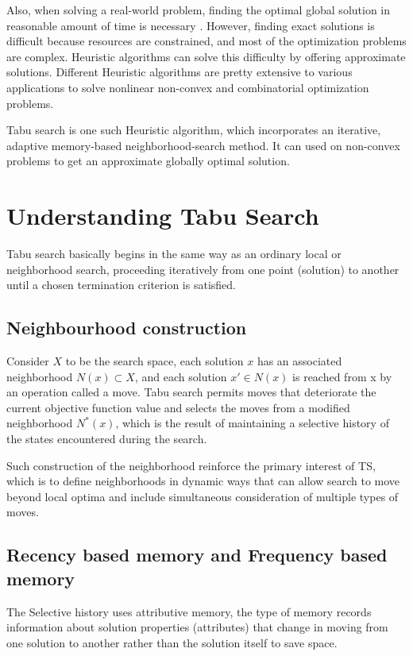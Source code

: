 \documentclass[conference]{IEEEtran}
\begin{document}
Also, when solving a real-world problem, finding the optimal global solution in
reasonable amount of time is necessary . However, finding exact solutions is difficult
because resources are constrained, and most of the optimization problems are
complex. Heuristic algorithms can solve this difficulty by offering approximate solutions.
Different Heuristic algorithms are pretty extensive to various applications to solve nonlinear non-convex and combinatorial optimization problems.

Tabu search is one such Heuristic algorithm, which incorporates an iterative, adaptive
memory-based neighborhood-search method. It can used on non-convex problems to
get an approximate globally optimal solution.

\section{\textbf{Understanding Tabu Search}}

Tabu search basically begins in the same way as an ordinary local or neighborhood search, proceeding iteratively from one point (solution) to another until a chosen termination criterion is satisfied.

\subsection{Neighbourhood construction}
Consider $X$ to be the search space, each solution $x$ has an associated neighborhood $N(x)\subset X $, and each solution $x′\in N(x)$ is reached from x by an operation called a move. Tabu search permits moves that deteriorate the current objective function value and selects the moves from a modified neighborhood $N^{*}(x)$, which is the result of maintaining a selective history of the states encountered during the search.

Such construction of the neighborhood reinforce the primary interest of TS, which is to define neighborhoods in dynamic ways that can allow search to move beyond local optima and include simultaneous consideration of multiple types of moves.

\subsection{Recency based memory and Frequency based memory}

The Selective history uses attributive memory, the type of memory records information about solution properties (attributes) that change in moving from one solution to another rather than the solution itself to save space.
\end{document}
